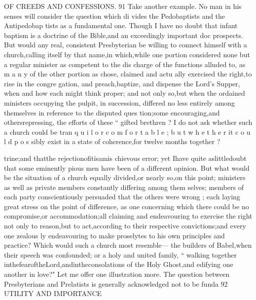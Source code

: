 \documentclass[
]{book}
\begin{document}
OF CREEDS AND CONFESSIONS. 91
Take another example. No man in his senses will consider the question which di vides the Pedobaptists and the Antipedobap tists as a fundamental one. Though I have no doubt that infant baptism is a doctrine of the Bible,and an exceedingly important doc
prospects. But would any real, consistent Presbyterian be willing to connect himself with a church,calling itself by that name,in which,while one portion considered none but a regular minister as competent to the dis charge of the functions alluded to, as m a n y of
the other portion as chose, claimed and actu ally exercised the right,to rise in the congre
gation, and preach,baptize, and dispense the Lord's Supper, when and how each might think proper; and not only so,but when the
ordained ministers occupying the pulpit, in succession, differed no less entirely among themselves in reference to the disputed ques
tion;some encouraging,and othersrepressing, the efforts of these `` gifted brethren ? I do not ask whether such a church could be tran
q u i l o r c o m f o r t a b l e ; b u t w h e t h e r it c o u l d p o s sibly exist in a state of coherence,for twelve months together ?

trine;and thatthe rejectionofitisamis
chievous error; yet Ihave quite aslittledoubt that some eminently pious men have been of a different opinion. But what would be the situation of a church equally divided,or nearly
so,on this point; ministers as well as private members constantly differing among them
selves; members of each party conscientiously persuaded that the others were wrong ; each laying great stress on the point of difference, as one concerning which there could be no
compromise,or accommodation;all claiming and endeavouring to exercise the right not only to reason,but to act,according to their respective convictions;and every one zealous ly endeavouring to make proselytes to his own principles and practice? Which would such a church most resemble--- the builders of Babel,when their speech was confounded; or a holy and united family, `` walking together inthefearoftheLord,andintheconsolations
of the Holy Ghost,and edifying one another in love?"
Let me offer one illustration more. The question between Presbyterians and Prelatists is generally acknowledged not to be funda
92 UTILITY AND IMPORTANCE
\end{document}
